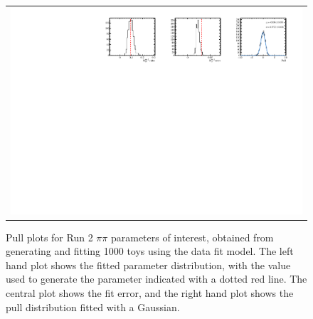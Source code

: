 \begin{figure}
\begin{tabular}{c}
\includegraphics[width=\textwidth]{ANA_resources/Plots/Data_fit/FitterBias//R_ds_pipi_run2.pdf} \\
  \end{tabular}
  \caption{Pull plots for Run 2 $\pi\pi$ parameters of interest, obtained from generating and fitting 1000 toys using the data fit model. The left hand plot shows the fitted parameter distribution, with the value used to generate the parameter indicated with a dotted red line. The central plot shows the fit error, and the right hand plot shows the pull distribution fitted with a Gaussian.}
\label{fig:pipi_run2_pulls}
\end{figure}
